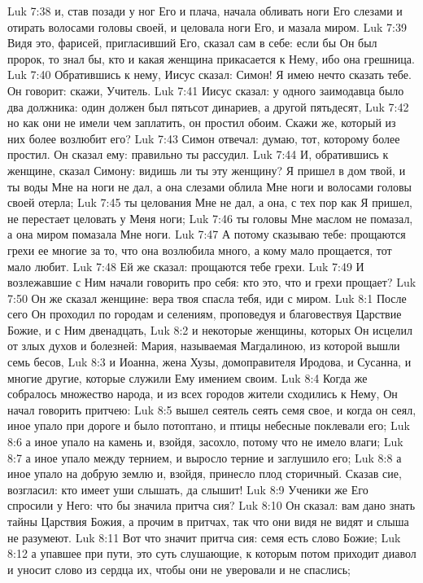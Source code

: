 Luk 7:38  и, став позади у ног Его и плача, начала обливать ноги Его слезами и отирать волосами головы своей, и целовала ноги Его, и мазала миром.
Luk 7:39  Видя это, фарисей, пригласивший Его, сказал сам в себе: если бы Он был пророк, то знал бы, кто и какая женщина прикасается к Нему, ибо она грешница.
Luk 7:40  Обратившись к нему, Иисус сказал: Симон! Я имею нечто сказать тебе. Он говорит: скажи, Учитель.
Luk 7:41  Иисус сказал: у одного заимодавца было два должника: один должен был пятьсот динариев, а другой пятьдесят,
Luk 7:42  но как они не имели чем заплатить, он простил обоим. Скажи же, который из них более возлюбит его?
Luk 7:43  Симон отвечал: думаю, тот, которому более простил. Он сказал ему: правильно ты рассудил.
Luk 7:44  И, обратившись к женщине, сказал Симону: видишь ли ты эту женщину? Я пришел в дом твой, и ты воды Мне на ноги не дал, а она слезами облила Мне ноги и волосами головы своей отерла;
Luk 7:45  ты целования Мне не дал, а она, с тех пор как Я пришел, не перестает целовать у Меня ноги;
Luk 7:46  ты головы Мне маслом не помазал, а она миром помазала Мне ноги.
Luk 7:47  А потому сказываю тебе: прощаются грехи ее многие за то, что она возлюбила много, а кому мало прощается, тот мало любит.
Luk 7:48  Ей же сказал: прощаются тебе грехи.
Luk 7:49  И возлежавшие с Ним начали говорить про себя: кто это, что и грехи прощает?
Luk 7:50  Он же сказал женщине: вера твоя спасла тебя, иди с миром.
Luk 8:1  После сего Он проходил по городам и селениям, проповедуя и благовествуя Царствие Божие, и с Ним двенадцать,
Luk 8:2  и некоторые женщины, которых Он исцелил от злых духов и болезней: Мария, называемая Магдалиною, из которой вышли семь бесов,
Luk 8:3  и Иоанна, жена Хузы, домоправителя Иродова, и Сусанна, и многие другие, которые служили Ему имением своим.
Luk 8:4  Когда же собралось множество народа, и из всех городов жители сходились к Нему, Он начал говорить притчею:
Luk 8:5  вышел сеятель сеять семя свое, и когда он сеял, иное упало при дороге и было потоптано, и птицы небесные поклевали его;
Luk 8:6  а иное упало на камень и, взойдя, засохло, потому что не имело влаги;
Luk 8:7  а иное упало между тернием, и выросло терние и заглушило его;
Luk 8:8  а иное упало на добрую землю и, взойдя, принесло плод сторичный. Сказав сие, возгласил: кто имеет уши слышать, да слышит!
Luk 8:9  Ученики же Его спросили у Него: что бы значила притча сия?
Luk 8:10  Он сказал: вам дано знать тайны Царствия Божия, а прочим в притчах, так что они видя не видят и слыша не разумеют.
Luk 8:11  Вот что значит притча сия: семя есть слово Божие;
Luk 8:12  а упавшее при пути, это суть слушающие, к которым потом приходит диавол и уносит слово из сердца их, чтобы они не уверовали и не спаслись;

